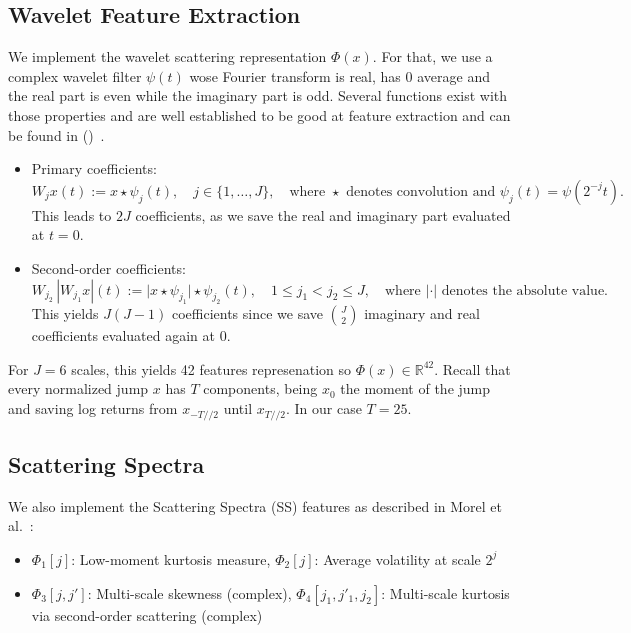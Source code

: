 \documentclass[11pt,a4paper]{article}
\begin{document}
\subsection{Wavelet Feature Extraction}

We implement the wavelet scattering representation $\Phi(x)$. For that, we use a complex wavelet filter $\psi(t)$ wose Fourier transform is real, has 0 average and the real part is even while the imaginary part is odd. Several functions exist with those properties and are well established to be good at feature extraction and can be found in ()~\cite{pywt}.

\begin{itemize}
    \item Primary coefficients: \[
W_j x(t) := x \star \psi_j(t), \quad j \in \{1,\ldots,J\}, \quad \text{where } \star \text{ denotes convolution and } \psi_j(t) = \psi(2^{-j} t).
\] This leads to $2J$ coefficients, as we save the real and imaginary part evaluated at $t=0$.
    \item Second-order coefficients: \[
W_{j_2} \, |W_{j_1} x|(t) := \big| x \star \psi_{j_1} \big| \star \psi_{j_2} (t), \quad 
1\leq j_1 < j_2 \leq J, \quad \text{where } |\cdot| \text{ denotes the absolute value.}
\] This yields $J(J-1)$ coefficients since we save $J\choose 2$ imaginary and real coefficients evaluated again at 0.
\end{itemize}

For $J=6$ scales, this yields 42 features represenation so $\Phi(x)\in\mathbb{R}^{42}$. Recall that every normalized jump $x$ has $T$ components, being $x_0$ the moment of the jump and saving log returns from $x_{-T//2}$ until $x_{T//2}$. In our case $T=25$. 

\subsection{Scattering Spectra}

We also implement the Scattering Spectra (SS) features as described in Morel et al.~\cite{morel2022scale}:
\begin{itemize}
    \item $\Phi_1[j]$: Low-moment kurtosis measure, $\Phi_2[j]$: Average volatility at scale $2^j$
    \item $\Phi_3[j,j']$: Multi-scale skewness (complex), $\Phi_4[j_1,j'_1,j_2]$: Multi-scale kurtosis via second-order scattering (complex)
\end{itemize}
\end{document}
